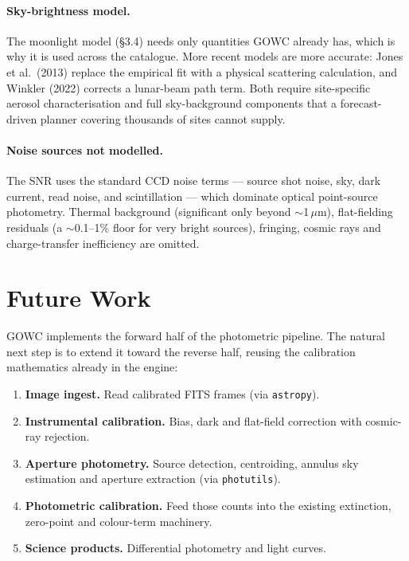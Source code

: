 \documentclass[11pt]{article}
\begin{document}
\paragraph{Sky-brightness model.} The moonlight model (\S3.4) needs only quantities
GOWC already has, which is why it is used across the catalogue. More recent models are
more accurate: Jones et al.\ (2013) \cite{jones2013} replace the empirical fit with a
physical scattering calculation, and Winkler (2022) \cite{winkler2022} corrects a
lunar-beam path term. Both require site-specific aerosol characterisation and full
sky-background components that a forecast-driven planner covering thousands of sites
cannot supply.

\paragraph{Noise sources not modelled.} The SNR uses the standard CCD noise terms ---
source shot noise, sky, dark current, read noise, and scintillation --- which dominate
optical point-source photometry. Thermal background (significant only beyond
$\sim$1\,$\mu$m), flat-fielding residuals (a $\sim$0.1--1\% floor for very bright
sources), fringing, cosmic rays and charge-transfer inefficiency are omitted.

\section{Future Work}
\label{sec:future}

GOWC implements the forward half of the photometric pipeline. The natural next step
is to extend it toward the reverse half, reusing the calibration mathematics already
in the engine:

\begin{enumerate}\setlength{\itemsep}{2pt}
\item \textbf{Image ingest.} Read calibrated FITS frames (via \texttt{astropy}).
\item \textbf{Instrumental calibration.} Bias, dark and flat-field correction with
cosmic-ray rejection.
\item \textbf{Aperture photometry.} Source detection, centroiding, annulus sky
estimation and aperture extraction (via \texttt{photutils}).
\item \textbf{Photometric calibration.} Feed those counts into the existing
extinction, zero-point and colour-term machinery.
\item \textbf{Science products.} Differential photometry and light curves.
\end{enumerate}
\end{document}
